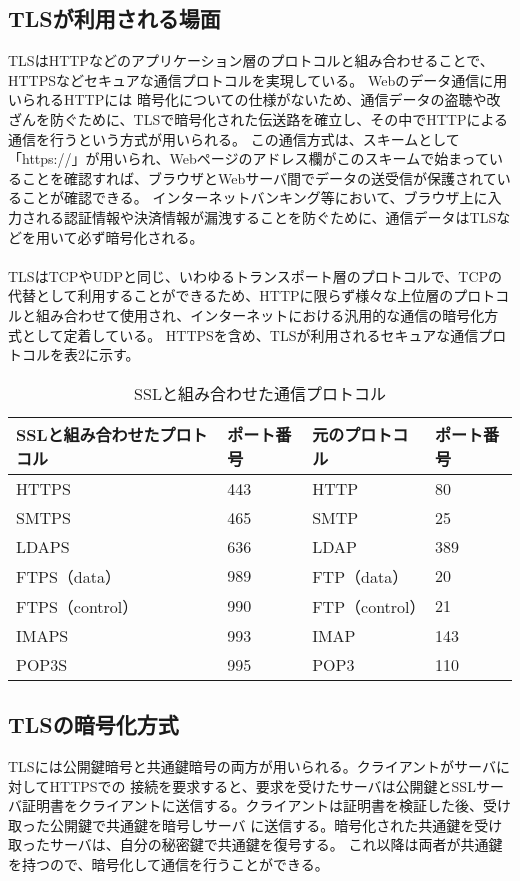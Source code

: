 \documentclass[dvipdfmx,autodetect-engine,titlepage]{jsarticle}
\begin{document}
\subsection{TLSが利用される場面}
TLSはHTTPなどのアプリケーション層のプロトコルと組み合わせることで、HTTPSなどセキュアな通信プロトコルを実現している。
Webのデータ通信に用いられるHTTPには 暗号化についての仕様がないため、通信データの盗聴や改ざんを防ぐために、TLSで暗号化された伝送路を確立し、その中でHTTPによる通信を行うという方式が用いられる。
この通信方式は、スキームとして「https://」が用いられ、Webページのアドレス欄がこのスキームで始まっていることを確認すれば、ブラウザとWebサーバ間でデータの送受信が保護されていることが確認できる。
インターネットバンキング等において、ブラウザ上に入力される認証情報や決済情報が漏洩することを防ぐために、通信データはTLSなどを用いて必ず暗号化される。\\\\
TLSはTCPやUDPと同じ、いわゆるトランスポート層のプロトコルで、TCPの代替として利用することができるため、HTTPに限らず様々な上位層のプロトコルと組み合わせて使用され、インターネットにおける汎用的な通信の暗号化方式として定着している。
HTTPSを含め、TLSが利用されるセキュアな通信プロトコルを表2に示す。\\

\begin{table}[H]
  \centering
  \caption{SSLと組み合わせた通信プロトコル}
  \begin{tabular}{|l|l|l|l|}
  \hline
  SSLと組み合わせたプロトコル & ポート番号 & 元のプロトコル      & ポート番号 \\ \hline
  HTTPS           & 443   & HTTP         & 80    \\ \hline
  SMTPS           & 465   & SMTP         & 25    \\ \hline
  LDAPS           & 636   & LDAP         & 389   \\ \hline
  FTPS（data）      & 989   & FTP（data）    & 20    \\ \hline
  FTPS（control）   & 990   & FTP（control） & 21    \\ \hline
  IMAPS           & 993   & IMAP         & 143   \\ \hline
  POP3S           & 995   & POP3         & 110   \\ \hline
  \end{tabular}
  \end{table}

\subsection{TLSの暗号化方式}
TLSには公開鍵暗号と共通鍵暗号の両方が用いられる。クライアントがサーバに対してHTTPSでの 接続を要求すると、要求を受けたサーバは公開鍵とSSLサーバ証明書をクライアントに送信する。クライアントは証明書を検証した後、受け取った公開鍵で共通鍵を暗号しサーバ に送信する。暗号化された共通鍵を受け取ったサーバは、自分の秘密鍵で共通鍵を復号する。
これ以降は両者が共通鍵を持つので、暗号化して通信を行うことができる。\\
\end{document}
